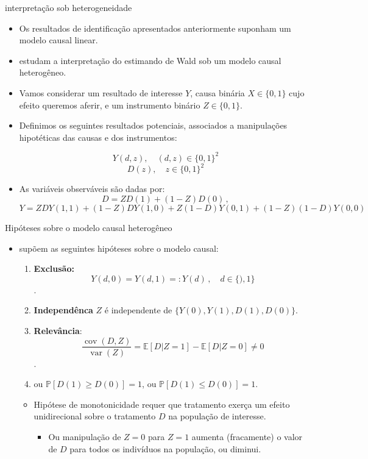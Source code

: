 \documentclass[11pt]{beamer}
\begin{document}
\begin{frame}{interpretação sob heterogeneidade}
	\begin{itemize}
		\item Os resultados de identificação apresentados anteriormente suponham um modelo causal linear.
		\item \citet{Imbens1994} estudam a interpretação do estimando de Wald sob um modelo causal heterogêneo.
		\item Vamos considerar um resultado de interesse $Y$, causa binária $X \in \{0,1\}$ cujo efeito queremos aferir, e um instrumento binário $Z \in \{0,1\}$.
		\item Definimos os seguintes resultados potenciais, associados a manipulações hipotéticas das causas e dos instrumentos:
		
		$$Y(d,z), \quad (d,z) \in \{0,1\}^2$$
		$$D(z), \quad z \in \{0,1\}^2$$
		\item As variáveis observáveis são dadas por:
		{\small 
		$$D = Z D(1)+(1-Z) D(0)\, ,$$
		$$Y = ZD Y(1,1) + (1-Z)DY(1,0) + Z(1-D) Y(0,1) + (1-Z)(1-D) Y(0,0)$$
	}
	\end{itemize}
\end{frame}
\begin{frame}{Hipóteses sobre o modelo causal heterogêneo}
\begin{itemize}
	\item 	\citet{Imbens1994} supõem as seguintes hipóteses sobre o modelo causal:
	\begin{enumerate}
		\item \textbf{Exclusão:} $$Y(d,0)= Y(d,1) =: Y(d)\, ,\quad d \in \{),1\}$$.
		\item \textbf{Independênca} $Z$ é independente de $\{Y(0), Y(1), D(1), D(0)\}$.
		\item \textbf{Relevância}: $$\frac{\operatorname{cov}(D,Z)}{\operatorname{var}(Z)} = \mathbb{E}[D|Z=1] - \mathbb{E}[D|Z=0]\neq 0$$.
		\item  {} ou $\mathbb{P}[D(1)\geq D(0)]=1$, ou $\mathbb{P}[D(1)\leq D(0)]=1$.
	\end{enumerate}
	\begin{itemize}
		\item Hipótese de monotonicidade requer que tratamento exerça um efeito unidirecional sobre o tratamento $D$ na população de interesse.
		\begin{itemize}
			\item Ou manipulação de $Z=0$ para $Z=1$ aumenta (fracamente) o valor de $D$ para todos os indivíduos na população, ou diminui.
		\end{itemize}
	\end{itemize}
\end{itemize}
\end{frame}
\end{document}
